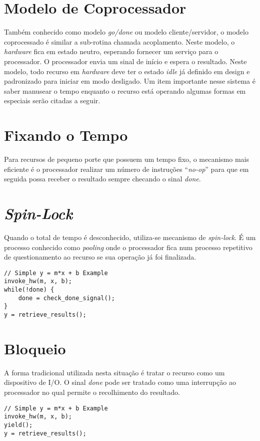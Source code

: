 \section{Modelo de Coprocessador}
Também conhecido como modelo \textit{go/done} ou modelo cliente/servidor, o modelo coprocessado é similar a sub-rotina chamada acoplamento. Neste modelo, o \textit{hardware} fica em estado neutro, esperando fornecer um serviço para o processador. O processador envia um sinal de início e espera o resultado. Neste modelo, todo recurso em \textit{hardware} deve ter o estado \textit{idle} já definido em design e padronizado para iniciar em modo desligado. Um item importante nesse sistema é saber manusear o tempo enquanto o recurso está operando algumas formas em especiais serão citadas a seguir.

\section{Fixando o Tempo}
Para recursos de pequeno porte que possuem um tempo fixo, o mecanismo mais eficiente é o processador realizar um número de instruções ``\textit{no-op}'' para que em seguida possa receber o resultado sempre checando o sinal \textit{done}.

\section{\textit{Spin-Lock}}
Quando o total de tempo é desconhecido, utiliza-se mecanismo de \textit{spin-lock}. É um processo conhecido como \textit{pooling} onde o processador fica num processo repetitivo de questionamento ao recurso se sua operação já foi finalizada.

\begin{verbatim}
// Simple y = m*x + b Example 
invoke_hw(m, x, b); 
while(!done) {
    done = check_done_signal(); 
}
y = retrieve_results();
\end{verbatim}

\section{Bloqueio}
A forma tradicional utilizada nesta situação é tratar o recurso como um dispositivo de I/O. O sinal \textit{done} pode ser tratado como uma interrupção ao processador no qual permite o recolhimento do resultado.
\begin{verbatim}
// Simple y = m*x + b Example 
invoke_hw(m, x, b);
yield();
y = retrieve_results();
\end{verbatim}

